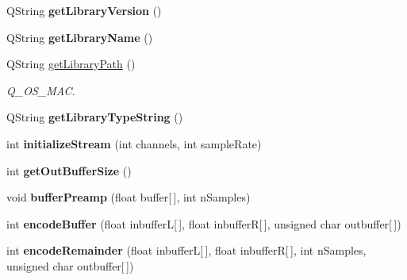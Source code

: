 \begin{DoxyCompactItemize}
Q\+String {\bfseries get\+Library\+Version} ()
\item 
\mbox{\label{class_ms_1_1_m_p3_exporter_a4597555cd7f8251dcd8c95f162145971}} 
Q\+String {\bfseries get\+Library\+Name} ()
\item 
\mbox{\label{class_ms_1_1_m_p3_exporter_a7ec3fd271083012548e42181aa4ec3c3}} 
Q\+String \hyperlink{class_ms_1_1_m_p3_exporter_a7ec3fd271083012548e42181aa4ec3c3}{get\+Library\+Path} ()
\begin{DoxyCompactList}\small\item\em Q\+\_\+\+O\+S\+\_\+\+M\+AC. \end{DoxyCompactList}\item 
\mbox{\label{class_ms_1_1_m_p3_exporter_ad50a0e8de80ce0ac0ad177ee9fa50d60}} 
Q\+String {\bfseries get\+Library\+Type\+String} ()
\item 
\mbox{\label{class_ms_1_1_m_p3_exporter_aa0cb568c20ea8dbd6640439754493824}} 
int {\bfseries initialize\+Stream} (int channels, int sample\+Rate)
\item 
\mbox{\label{class_ms_1_1_m_p3_exporter_a1943b87e4496c4540624988e3c920b5f}} 
int {\bfseries get\+Out\+Buffer\+Size} ()
\item 
\mbox{\label{class_ms_1_1_m_p3_exporter_abc6212e43636a5998be25b75a506e208}} 
void {\bfseries buffer\+Preamp} (float buffer\mbox{[}$\,$\mbox{]}, int n\+Samples)
\item 
\mbox{\label{class_ms_1_1_m_p3_exporter_a9fdaa7eae18c94d4bb7ec6ab64681de7}} 
int {\bfseries encode\+Buffer} (float inbufferL\mbox{[}$\,$\mbox{]}, float inbufferR\mbox{[}$\,$\mbox{]}, unsigned char outbuffer\mbox{[}$\,$\mbox{]})
\item 
\mbox{\label{class_ms_1_1_m_p3_exporter_a4b36c14174db76b872c766c29f3dad1f}} 
int {\bfseries encode\+Remainder} (float inbufferL\mbox{[}$\,$\mbox{]}, float inbufferR\mbox{[}$\,$\mbox{]}, int n\+Samples, unsigned char outbuffer\mbox{[}$\,$\mbox{]})
\item 

\end{DoxyCompactItemize}
